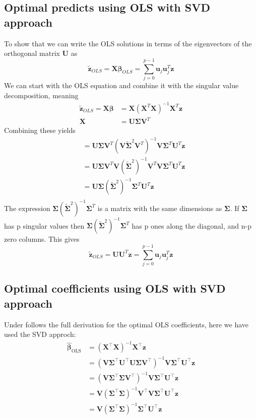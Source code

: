 \documentclass{article}
\newcommand{\XX}{\mathbf{X}}
\newcommand{\VV}{\mathbf{V}}
\newcommand{\UU}{\mathbf{U}}
\begin{document}
\subsection{Optimal predicts using OLS with SVD approach}
\label{app_derivations:predicts_ols_with_svd}
To show that we can write the OLS solutions in terms of the eigenvectors of the orthogonal matrix $\mathbf{U}$ as
$$\bm{\tilde{z}}_{OLS} = \mathbf{X}\bm{\beta}_{OLS} = \sum_{j=0}^{p-1}\bm{u}_{j}\bm{u}_{j}^{T}\bm{z}$$
We can start with the OLS equation and combine it with the singular value decomposition, meaning
\begin{align*}
    \bm{\tilde{z}}_{OLS} = \mathbf{X}\bm{\beta} &= \mathbf{X}(\mathbf{X}^{T}\mathbf{X})^{-1}\mathbf{X}^{T}\bm{z} \\
    \mathbf{X} &= \mathbf{U}\bm{\Sigma}\mathbf{V}^{T}
\end{align*}
Combining these yields
\begin{align*}
    &= \mathbf{U}\bm{\Sigma}\mathbf{V}^{T}(\mathbf{V}\bm{\tilde{{\Sigma}}}^{2}\mathbf{V}^{T})^{-1}\mathbf{V}\mathbf{\Sigma}^{T}\mathbf{U}^{T}\bm{z} \\
    &= \mathbf{U}\bm{\Sigma}\mathbf{V}^{T}\mathbf{V}(\bm{\tilde{{\Sigma}}}^{2})^{-1}\mathbf{V}^{T}\mathbf{V}\mathbf{\Sigma}^{T}\mathbf{U}^{T}\bm{z} \\ 
    &= \mathbf{U}\bm{\Sigma}(\bm{\tilde{{\Sigma}}}^{2})^{-1}\mathbf{\Sigma}^{T}\mathbf{U}^{T}\bm{z} \\
\end{align*}
The expression $\bm{\Sigma}(\bm{\tilde{{\Sigma}}}^{2})^{-1}\mathbf{\Sigma}^{T}$ is a matrix with the same dimensions as $\bm{\Sigma}$.
If $\bm{\Sigma}$ has p singular values then $\bm{\Sigma}(\bm{\tilde{{\Sigma}}}^{2})^{-1}\mathbf{\Sigma}^{T}$ has p ones along the
diagonal, and n-p zero columns.  
This gives 
$$\bm{\tilde{z}}_{OLS} = \mathbf{U}\mathbf{U}^{T}\bm{z} = \sum_{j=0}^{p-1}\bm{u}_{j}\bm{u}_{j}^{T}\bm{z}$$

\subsection{Optimal coefficients using OLS with SVD approach}
\label{app_derivations:beta_ols_with_svd}
Under follows the full derivation for the optimal OLS coefficients, here we have used the SVD approch:
\begin{align*}
    \bm{\hat{\beta}}_\text{OLS} &= (\XX^\top\XX)^{-1}\XX^\top\bm{z} \\
    &=(\VV\mathbf{\Sigma}^\top\UU^\top\UU\mathbf{\Sigma}\VV^\top)^{-1}\VV\mathbf{\Sigma}^\top\UU^\top\bm{z} \\
    &= (\VV\mathbf{\Sigma}^\top\mathbf{\Sigma}\VV^\top)^{-1}\VV\mathbf{\Sigma}^\top\UU^\top\bm{z} \\
    &= \VV(\mathbf{\Sigma}^\top\mathbf{\Sigma})^{-1}\VV^\top\VV\mathbf{\Sigma}^\top\UU^\top\bm{z} \\
    &= \VV(\mathbf{\Sigma}^\top\mathbf{\Sigma})^{-1}\mathbf{\Sigma}^\top\UU^\top\bm{z} 
\end{align*}
\end{document}
